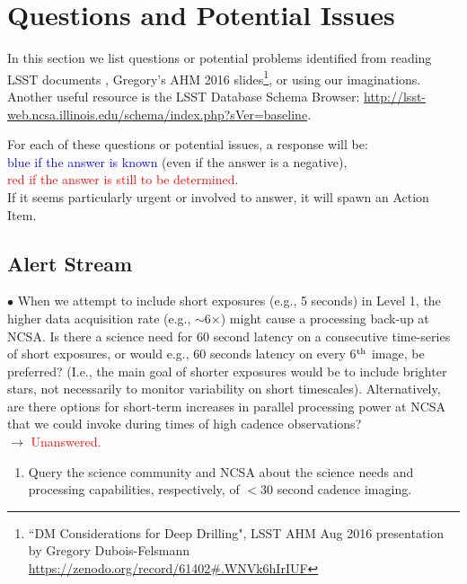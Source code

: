 \documentclass[DM,lsstdraft,toc]{lsstdoc}
\begin{document}
\clearpage
\section{Questions and Potential Issues}\label{sec:issues}

In this section we list questions or potential problems identified from reading LSST documents \citep{LSE-163,LDM-151}, Gregory's AHM 2016 slides\footnote{``DM Considerations for Deep Drilling", LSST AHM Aug 2016 presentation by Gregory Dubois-Felsmann \url{https://zenodo.org/record/61402\#.WNVk6hIrIUF}}, or using our imaginations. Another useful resource is the LSST Database Schema Browser: \url{http://lsst-web.ncsa.illinois.edu/schema/index.php?sVer=baseline}.

For each of these questions or potential issues, a response will be: \\
\textcolor{blue}{blue if the answer is known} (even if the answer is a negative), \\
\textcolor{red}{red if the answer is still to be determined}. \\
If it seems particularly urgent or involved to answer, it will spawn an Action Item.


\subsection{Alert Stream}\label{ssec:issues_alerts}

$\bullet$ When we attempt to include short exposures (e.g., 5 seconds) in Level 1, the higher data acquisition rate (e.g., $\sim$6$\times$) might cause a processing back-up at NCSA. Is there a science need for 60 second latency on a consecutive time-series of short exposures, or would e.g., 60 seconds latency on every 6$^{\rm th}$ image, be preferred? (I.e., the main goal of shorter exposures would be to include brighter stars, not necessarily to monitor variability on short timescales). Alternatively, are there options for short-term increases in parallel processing power at NCSA that we could invoke during times of high cadence observations? \\
$\rightarrow$ \textcolor{red}{Unanswered.}
\begin{enumerate}[resume,topsep=-10pt,label= \textbf{Action \Roman*.}] \item Query the science community and NCSA about the science needs and processing capabilities, respectively, of $<30$ second cadence imaging. \end{enumerate}
\end{document}
